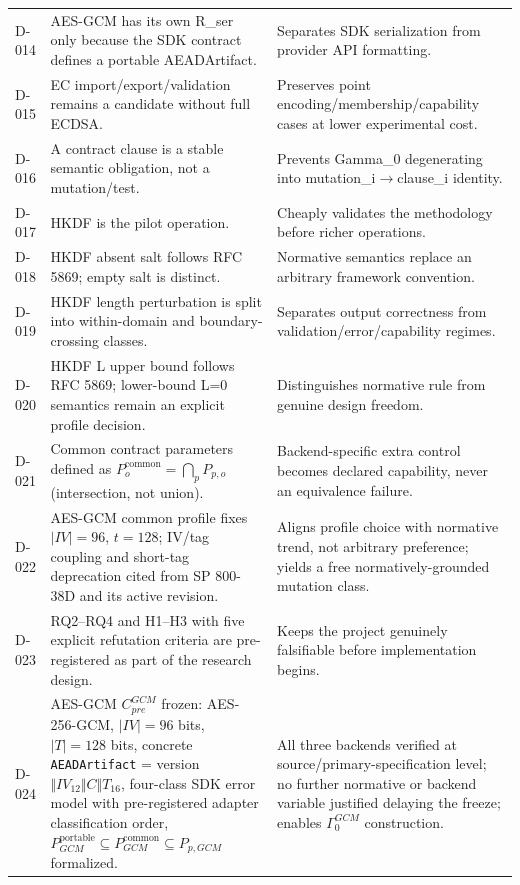 \documentclass[11pt,a4paper]{article}
\begin{document}
\begin{longtable}{@{}L{0.28\textwidth}L{0.34\textwidth}L{0.30\textwidth}@{}}
D-014 & AES-GCM has its own R\_ser only because the SDK contract defines a portable AEADArtifact. & Separates SDK serialization from provider API formatting.\\
D-015 & EC import/export/validation remains a candidate without full ECDSA. & Preserves point encoding/membership/capability cases at lower experimental cost.\\
D-016 & A contract clause is a stable semantic obligation, not a mutation/test. & Prevents Gamma\_0 degenerating into mutation\_i$\to$clause\_i identity.\\
D-017 & HKDF is the pilot operation. & Cheaply validates the methodology before richer operations.\\
D-018 & HKDF absent salt follows RFC 5869; empty salt is distinct. & Normative semantics replace an arbitrary framework convention.\\
D-019 & HKDF length perturbation is split into within-domain and boundary-crossing classes. & Separates output correctness from validation/error/capability regimes.\\
D-020 & HKDF L upper bound follows RFC 5869; lower-bound L=0 semantics remain an explicit profile decision. & Distinguishes normative rule from genuine design freedom.\\
D-021 & Common contract parameters defined as $P_o^{\text{common}}=\bigcap_p P_{p,o}$ (intersection, not union). & Backend-specific extra control becomes declared capability, never an equivalence failure.\\
D-022 & AES-GCM common profile fixes $|IV|=96$, $t=128$; IV/tag coupling and short-tag deprecation cited from SP 800-38D and its active revision. & Aligns profile choice with normative trend, not arbitrary preference; yields a free normatively-grounded mutation class.\\
D-023 & RQ2--RQ4 and H1--H3 with five explicit refutation criteria are pre-registered as part of the research design. & Keeps the project genuinely falsifiable before implementation begins.\\
D-024 & AES-GCM $C_{pre}^{GCM}$ frozen: AES-256-GCM, $|IV|=96$ bits, $|T|=128$ bits, concrete \texttt{AEADArtifact} = version$\Vert IV_{12}\Vert C\Vert T_{16}$, four-class SDK error model with pre-registered adapter classification order, $P_{GCM}^{\text{portable}} \subseteq P_{GCM}^{\text{common}} \subseteq P_{p,GCM}$ formalized. & All three backends verified at source/primary-specification level; no further normative or backend variable justified delaying the freeze; enables $\Gamma_0^{GCM}$ construction.\\

\end{longtable}
\end{document}

